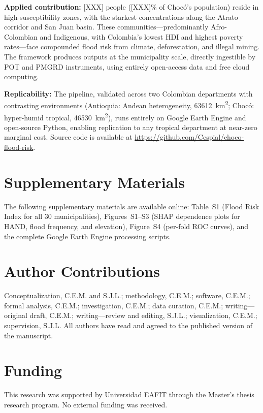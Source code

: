\documentclass{article}
\begin{document}
\textbf{Applied contribution:} [XXX] people ([XXX]\% of Choc\'o's population) reside in high-susceptibility zones, with the starkest concentrations along the Atrato corridor and San Juan basin. These communities---predominantly Afro-Colombian and Indigenous, with Colombia's lowest HDI and highest poverty rates---face compounded flood risk from climate, deforestation, and illegal mining. The framework produces outputs at the municipality scale, directly ingestible by POT and PMGRD instruments, using entirely open-access data and free cloud computing.

\textbf{Replicability:} The pipeline, validated across two Colombian departments with contrasting environments (Antioquia: Andean heterogeneity, \SI{63612}{\kilo\metre\squared}; Choc\'o: hyper-humid tropical, \SI{46530}{\kilo\metre\squared}), runs entirely on Google Earth Engine and open-source Python, enabling replication to any tropical department at near-zero marginal cost. Source code is available at \url{https://github.com/Cespial/choco-flood-risk}.

\section*{Supplementary Materials}

The following supplementary materials are available online: Table~S1 (Flood Risk Index for all 30 municipalities), Figures~S1--S3 (SHAP dependence plots for HAND, flood frequency, and elevation), Figure~S4 (per-fold ROC curves), and the complete Google Earth Engine processing scripts.

\section*{Author Contributions}

Conceptualization, C.E.M. and S.J.L.; methodology, C.E.M.; software, C.E.M.; formal analysis, C.E.M.; investigation, C.E.M.; data curation, C.E.M.; writing---original draft, C.E.M.; writing---review and editing, S.J.L.; visualization, C.E.M.; supervision, S.J.L. All authors have read and agreed to the published version of the manuscript.

\section*{Funding}

This research was supported by Universidad EAFIT through the Master's thesis research program. No external funding was received.
\end{document}
